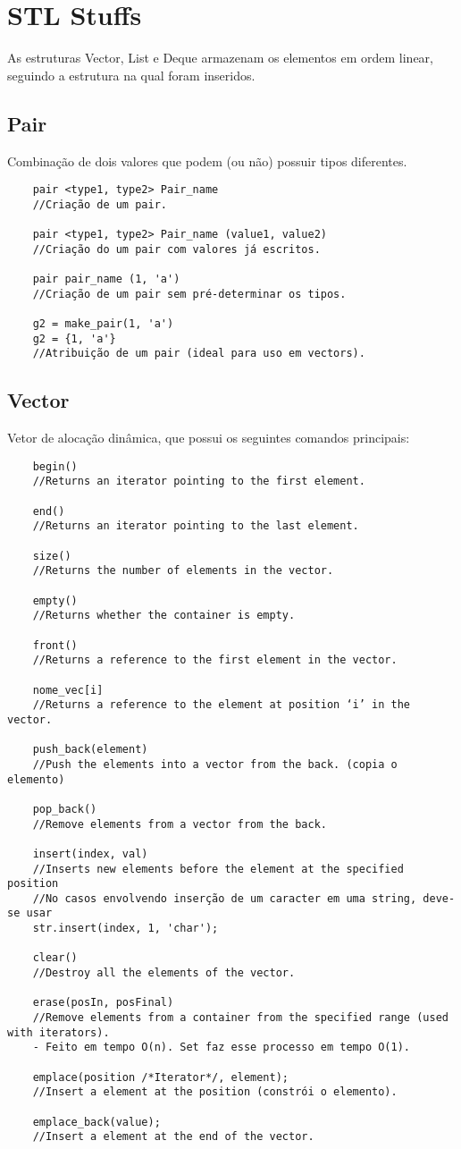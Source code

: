 \section{STL Stuffs}
As estruturas Vector, List e Deque armazenam os elementos em ordem linear,
seguindo a estrutura na qual foram inseridos.

\subsection{Pair}
Combinação de dois valores que podem (ou não) possuir tipos diferentes.
\begin{verbatim}
    pair <type1, type2> Pair_name 
    //Criação de um pair.

    pair <type1, type2> Pair_name (value1, value2) 
    //Criação do um pair com valores já escritos.

    pair pair_name (1, 'a') 
    //Criação de um pair sem pré-determinar os tipos.

    g2 = make_pair(1, 'a')
    g2 = {1, 'a'}
    //Atribuição de um pair (ideal para uso em vectors).
\end{verbatim}

\subsection{Vector}
Vetor de alocação dinâmica, que possui os seguintes comandos principais:
\begin{verbatim}
    begin()
    //Returns an iterator pointing to the first element.

    end() 
    //Returns an iterator pointing to the last element.

    size() 
    //Returns the number of elements in the vector.

    empty() 
    //Returns whether the container is empty.

    front() 
    //Returns a reference to the first element in the vector.

    nome_vec[i] 
    //Returns a reference to the element at position ‘i’ in the vector.

    push_back(element) 
    //Push the elements into a vector from the back. (copia o elemento)

    pop_back() 
    //Remove elements from a vector from the back.

    insert(index, val) 
    //Inserts new elements before the element at the specified position
    //No casos envolvendo inserção de um caracter em uma string, deve-se usar 
    str.insert(index, 1, 'char');

    clear() 
    //Destroy all the elements of the vector.

    erase(posIn, posFinal) 
    //Remove elements from a container from the specified range (used with iterators).
    - Feito em tempo O(n). Set faz esse processo em tempo O(1).

    emplace(position /*Iterator*/, element); 
    //Insert a element at the position (constrói o elemento).

    emplace_back(value); 
    //Insert a element at the end of the vector.
\end{verbatim}

